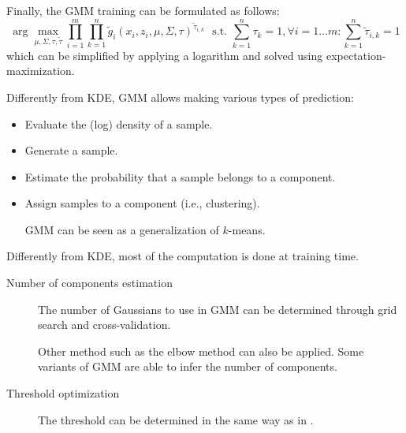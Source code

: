 \begin{description}
\begin{description}
            Finally, the GMM training can be formulated as follows:
            \[ \arg\max_{\mu, \Sigma, \tau, \tilde{\tau}} \prod_{i=1}^{m} \prod_{k=1}^{n} \tilde{g}_i(x_i, z_i, \mu, \Sigma, \tau)^{\tilde{\tau}_{i, k}} \,\,\text{ s.t. } \sum_{k=1}^{n} \tau_k = 1, \forall i =1\dots m: \sum_{k=1}^{n} \tilde{\tau}_{i, k} = 1 \]
            which can be simplified by applying a logarithm and solved using expectation-maximization.
        \end{description}
\end{description}

\begin{remark}
    Differently from KDE, GMM allows making various types of prediction:
    \begin{itemize}
        \item Evaluate the (log) density of a sample.
        \item Generate a sample.
        \item Estimate the probability that a sample belongs to a component.
        \item Assign samples to a component (i.e., clustering).
            \begin{remark}
                GMM can be seen as a generalization of $k$-means.
            \end{remark}
    \end{itemize}
\end{remark}


\begin{remark}
    Differently from KDE, most of the computation is done at training time.
\end{remark}


\begin{description}
    \item[Number of components estimation] 
        The number of Gaussians to use in GMM can be determined through grid search and cross-validation.

        \begin{remark}
            Other method such as the elbow method can also be applied. Some variants of GMM are able to infer the number of components.
        \end{remark}

    \item[Threshold optimization]
        The threshold can be determined in the same way as in .
\end{description}


